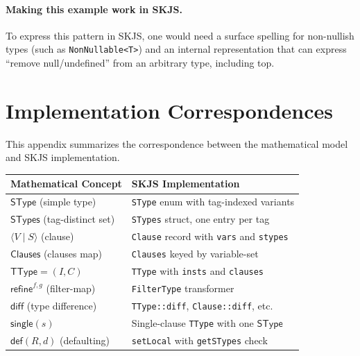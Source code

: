 \documentclass[11pt]{article}
\newcommand{\diff}{\mathsf{diff}}
\newcommand{\refineop}{\mathsf{refine}}
\newcommand{\SType}{\mathsf{SType}}
\newcommand{\TType}{\mathsf{TType}}
\newcommand{\Clauses}{\mathsf{Clauses}}
\newcommand{\STypes}{\mathsf{STypes}}
\newcommand{\clause}[2]{\langle #1 \mid #2 \rangle}
\begin{document}
\paragraph{Making this example work in SKJS.}
To express this pattern in SKJS, one would need a surface spelling for non-nullish types (such as \texttt{NonNullable<T>}) and an internal representation that can express ``remove null/undefined'' from an arbitrary type, including top.

\appendix

\section{Implementation Correspondences}
\label{app:impl}

This appendix summarizes the correspondence between the mathematical model and SKJS implementation.

\begin{keydef}
\renewcommand{\arraystretch}{1.3}
\begin{tabular}{@{}l@{\quad}l@{}}
\toprule
\textbf{Mathematical Concept} & \textbf{SKJS Implementation} \\
\midrule
$\SType$ (simple type) & \texttt{SType} enum with tag-indexed variants \\
$\STypes$ (tag-distinct set) & \texttt{STypes} struct, one entry per tag \\
$\clause{V}{S}$ (clause) & \texttt{Clause} record with \texttt{vars} and \texttt{stypes} \\
$\Clauses$ (clauses map) & \texttt{Clauses} keyed by variable-set \\
$\TType = (I, C)$ & \texttt{TType} with \texttt{insts} and \texttt{clauses} \\
$\refineop^{f,g}$ (filter-map) & \texttt{FilterType} transformer \\
$\diff$ (type difference) & \texttt{TType::diff}, \texttt{Clause::diff}, etc. \\
$\mathsf{single}(s)$ & Single-clause \texttt{TType} with one $\SType$ \\
$\mathsf{def}(R, d)$ (defaulting) & \texttt{setLocal} with \texttt{getSTypes} check \\
\bottomrule
\end{tabular}
\end{keydef}
\end{document}
